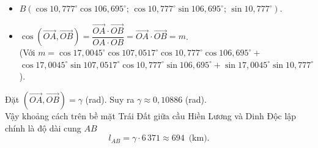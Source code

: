 \begin{bt}
{\begin{itemize}
			\item  $B\left(\cos 10{,}777^\circ \cos 106{,}695^\circ;\, \cos 10{,}777^\circ \sin 106{,}695^\circ;\, \sin 10{,}777^\circ\right)$.
			 \item $\cos \left(\overrightarrow{OA}, \overrightarrow{OB}\right) =\dfrac{\overrightarrow{OA}\cdot \overrightarrow{OB}}{OA\cdot OB}=\overrightarrow{OA}\cdot \overrightarrow{OB}=m$.\\
			(Với $m=\cos 17{,}0045^\circ \cos 107{,}0517^\circ \cos 10{,}777^\circ \cos 106{,}695^\circ +$\\ $\cos 17{,}0045^\circ \sin 107{,}0517^\circ \cos 10{,}777^\circ \sin 106{,}695^\circ + \sin  17{,}0045^\circ \sin 10{,}777^\circ$).
		\end{itemize}
		Đặt $\left(\overrightarrow{OA}, \overrightarrow{OB}\right)=\gamma  $ (rad). Suy ra $\gamma \approx 0{,}10886$ (rad).\\
		Vậy  khoảng cách trên bề mặt Trái Đất giữa cầu Hiền Lương và Dinh Độc lập chính là độ dài cung $AB$
		\[l_{AB}=\gamma\cdot 6\,371\approx 694 \, \text{ (km)}.\] 
	 }
\end{bt}

